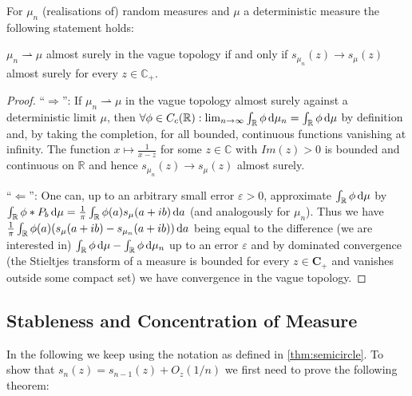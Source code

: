 \begin{theorem}
	For $\mu_n$ (realisations of) random measures and $\mu$ a deterministic measure the following statement holds:
	
	$\mu_n\rightharpoonup\mu$ almost surely in the vague topology if and only if $s_{\mu_n}(z)\rightarrow s_\mu(z)$ almost surely for every $z\in\mathbb C_+$.
\end{theorem}

\begin{proof}

	``$\Rightarrow$'': If $\mu_n\rightharpoonup\mu$ in the vague topology almost surely against a deterministic limit $\mu$, then $\forall \phi\in C_c(\mathbb R): \lim_{n\rightarrow\infty}\int_\mathbb{R}\phi \mathop{}\!\mathrm{d}\mu_n=\int_\mathbb{R}\phi \mathop{}\!\mathrm{d}\mu$ by definition and, by taking the completion, for all bounded, continuous functions vanishing at infinity. The function $x\mapsto \frac{1}{x-z}$ for some $z\in\mathbb C$ with $Im(z)>0$ is bounded and continuous on $\mathbb R$ and hence $s_{\mu_n}(z)\rightarrow s_\mu(z)$ almost surely.
	
	``$\Leftarrow$'': One can, up to an arbitrary small error $\varepsilon>0$, approximate $\int_\mathbb{R}\phi\mathop{}\!\mathrm{d}\mu$ by $\int_\mathbb{R}\phi*P_b \mathop{}\!\mathrm{d}\mu = \frac{1}{\pi}\int_\mathbb{R}\phi(a)s_\mu(a+ib)\mathop{}\!\mathrm{d} a$ (and analogously for $\mu_n$).
	Thus we have $\frac{1}{\pi}\int_\mathbb{R}\phi(a)(s_\mu(a+ib)-s_{\mu_n}(a+ib))\mathop{}\!\mathrm{d} a$ being equal to the difference (we are interested in) $\int_\mathbb{R}\phi\mathop{}\!\mathrm{d}\mu - \int_\mathbb{R}\phi\mathop{}\!\mathrm{d}\mu_n$ up to an error $\varepsilon$ and by dominated convergence (the Stieltjes transform of a measure is bounded for every $z\in \mathbf C_+$ and vanishes outside some compact set) we have convergence in the vague topology.
\end{proof}

\subsection{Stableness and Concentration of Measure}
In the following we keep using the notation as defined in \ref{thm:semicircle}. To show that $s_n(z)=s_{n-1}(z)+O_z(1/n)$ we first need to prove the following theorem:


